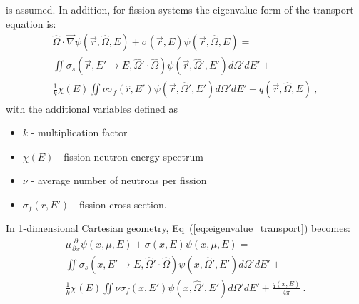 is assumed. In addition, for fission systems the eigenvalue form of
the transport equation is:
\begin{multline}
  \hat{\Omega} \cdot \vec{\nabla} \psi(\vec{r},\hat{\Omega},E) +
  \sigma(\vec{r},E) \psi(\vec{r},\hat{\Omega},E) = \\ \iint
  \sigma_s(\vec{r},E' \rightarrow E,\hat{\Omega}' \cdot \hat{\Omega})
  \psi(\vec{r},\hat{\Omega}',E') d\Omega' dE' + \\ \frac{1}{k} \chi(E)
  \iint \nu \sigma_f(\hat{r},E') \psi(\vec{r},\hat{\Omega}',E')
  d\Omega' dE' + q(\vec{r},\hat{\Omega},E) \:,
  \label{eq:eigenvalue_transport}
\end{multline}
with the additional variables defined as
\begin{itemize}
\item $k$ - multiplication factor
\item $\chi(E)$ - fission neutron energy spectrum
\item $\nu$ - average number of neutrons per fission
\item $\sigma_f(r,E')$ - fission cross section\:.
\end{itemize}
In 1-dimensional Cartesian geometry,
Eq~(\ref{eq:eigenvalue_transport}) becomes:
\begin{multline}
  \mu \frac{\partial}{\partial x} \psi(x,\mu,E) + \sigma(x,E)
  \psi(x,\mu,E) = \\ \iint \sigma_s(x,E' \rightarrow
  E,\hat{\Omega}' \cdot \hat{\Omega}) \psi(x,\hat{\Omega}',E')
  d\Omega' dE' + \\ \frac{1}{k} \chi(E)
  \iint \nu \sigma_f(x,E') \psi(x,\hat{\Omega}',E') d\Omega'
  dE' + \frac{q(x,E)}{4 \pi}\:.
  \label{eq:cart_1d_eigenvalue}
\end{multline}


